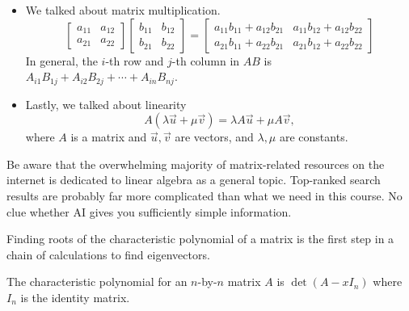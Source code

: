 \documentclass[../main.tex]{subfiles}
\begin{document}
\begin{itemize}
  \item We talked about matrix multiplication.
    \[
      \begin{bmatrix}
        a_{11} & a_{12} \\
        a_{21} & a_{22}
      \end{bmatrix}
      \begin{bmatrix}
        b_{11} & b_{12} \\
        b_{21} & b_{22}
      \end{bmatrix}
      =
      \begin{bmatrix}
        a_{11}b_{11} + a_{12}b_{21} &  a_{11}b_{12} + a_{12}b_{22} \\
        a_{21}b_{11} + a_{22}b_{21} &  a_{21}b_{12} + a_{22}b_{22}
      \end{bmatrix}
    \]
     
    In general, the \(i\)-th row and \(j\)-th column   in \(AB\) is \(A_{i1}B_{1j} + A_{i2}B_{2j} + \cdots + A_{in}B_{nj}\).

  \item Lastly, we talked about linearity 
    \[
      A (\lambda \vec{u} + \mu \vec{v}) = \lambda A\vec{u} + \mu A \vec{v},
    \]
    where \(A\) is a matrix and \(\vec{u}, \vec{v}\) are vectors, and \(\lambda, \mu\) are constants.
\end{itemize}
\vfill{}

{\footnotesize \faExclamationTriangle{} Be aware that the overwhelming majority of matrix-related resources  on the internet is dedicated to linear algebra as a general topic. Top-ranked search results are probably far more complicated than what we need in this course. No clue whether AI gives you sufficiently simple information.}
\clearpage

Finding roots of the characteristic polynomial of a matrix is the first step in a chain of calculations to find eigenvectors.

\begin{definition} \label{def:characteristic-polynomial}
  The characteristic polynomial for an \(n\)-by-\(n\) matrix \(A\) is \(\det(A - xI_{n})\) where \(I_{n}\) is the identity matrix.
\end{definition}
\end{document}
